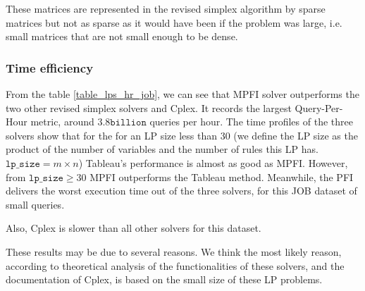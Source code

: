 These matrices are represented
in the revised simplex algorithm by
sparse matrices but not as sparse as it would have been if the problem was large, i.e.
small matrices that are not small enough to be dense.

\subsubsection{Time efficiency}
From the table \ref{table_lps_hr_job}, we can see that MPFI solver
outperforms the two other revised simplex solvers and Cplex. It records
the largest Query-Per-Hour metric, around $ 3.8 \texttt{billion}$ queries per hour.
The time profiles of the three solvers show that for the for
an LP size less than 30 (we define the LP size as the product of the number
of variables and the number of rules this LP has. $\texttt{lp\_size} = m \times n$)
Tableau's performance is almost as good as MPFI.
However, from $\texttt{lp\_size} \geq 30$ MPFI outperforms the Tableau method.
Meanwhile, the PFI delivers the worst execution time out of the three solvers, for
this JOB dataset of small queries.

Also, Cplex is slower than all other solvers for this dataset.

These results may be due to several reasons. We think the most likely reason,
according to theoretical analysis of the functionalities of these solvers, and the documentation
of Cplex, is based on the small size of these LP problems.

